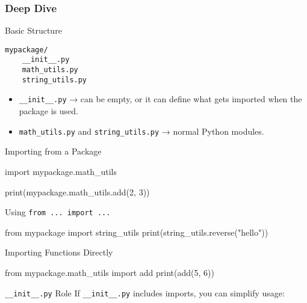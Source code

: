 \documentclass[
  letterpaper,
  DIV=11,
  numbers=noendperiod]{scrreprt}
\newenvironment{Shaded}{\begin{snugshade}}{\end{snugshade}}
\newcommand{\BuiltInTok}[1]{\textcolor[rgb]{0.00,0.23,0.31}{#1}}
\newcommand{\DecValTok}[1]{\textcolor[rgb]{0.68,0.00,0.00}{#1}}
\newcommand{\ImportTok}[1]{\textcolor[rgb]{0.00,0.46,0.62}{#1}}
\newcommand{\NormalTok}[1]{\textcolor[rgb]{0.00,0.23,0.31}{#1}}
\newcommand{\StringTok}[1]{\textcolor[rgb]{0.13,0.47,0.30}{#1}}
\providecommand{\tightlist}{%
  \setlength{\itemsep}{0pt}\setlength{\parskip}{0pt}}
\begin{document}
\subsubsection{Deep Dive}\label{deep-dive-46}

Basic Structure

\begin{verbatim}
mypackage/
    __init__.py
    math_utils.py
    string_utils.py
\end{verbatim}

\begin{itemize}
\tightlist
\item
  \texttt{\_\_init\_\_.py} → can be empty, or it can define what gets
  imported when the package is used.
\item
  \texttt{math\_utils.py} and \texttt{string\_utils.py} → normal Python
  modules.
\end{itemize}

Importing from a Package

\begin{Shaded}
\begin{Highlighting}[]
\ImportTok{import}\NormalTok{ mypackage.math\_utils}

\BuiltInTok{print}\NormalTok{(mypackage.math\_utils.add(}\DecValTok{2}\NormalTok{, }\DecValTok{3}\NormalTok{))}
\end{Highlighting}
\end{Shaded}

Using \texttt{from\ ...\ import\ ...}

\begin{Shaded}
\begin{Highlighting}[]
\ImportTok{from}\NormalTok{ mypackage }\ImportTok{import}\NormalTok{ string\_utils}
\BuiltInTok{print}\NormalTok{(string\_utils.reverse(}\StringTok{"hello"}\NormalTok{))}
\end{Highlighting}
\end{Shaded}

Importing Functions Directly

\begin{Shaded}
\begin{Highlighting}[]
\ImportTok{from}\NormalTok{ mypackage.math\_utils }\ImportTok{import}\NormalTok{ add}
\BuiltInTok{print}\NormalTok{(add(}\DecValTok{5}\NormalTok{, }\DecValTok{6}\NormalTok{))}
\end{Highlighting}
\end{Shaded}

\texttt{\_\_init\_\_.py} Role If \texttt{\_\_init\_\_.py} includes
imports, you can simplify usage:
\end{document}
